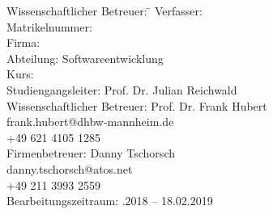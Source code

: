 \begin{titlepage}
\begin{center}
\begin{minipage}{\textwidth}

\begin{tabbing}
	Wissenschaftlicher Betreuer: \hspace{0.85cm}\=\kill
	Verfasser: \> \DerAutorDerArbeit \\[1.5mm]
	Matrikelnummer:  \\[1.5mm]
	Firma: \> \DerNameDerFirma  \\[1.5mm]
	Abteilung: \> Softwareentwicklung \\[1.5mm]
	Kurs: \> \DieKursbezeichnung \\[1.5mm]
	Studiengangsleiter: \> Prof. Dr. Julian Reichwald  \\[1.5mm]
	Wissenschaftlicher Betreuer: \> Prof. Dr. Frank Hubert  \\
	\> frank.hubert@dhbw-mannheim.de \\
	\> +49 621 4105 1285 \\[1.5mm]
	Firmenbetreuer: \> Danny Tschorsch \\
	\> danny.tschorsch@atos.net \\
	\> +49 211 3993 2559 \\[1.5mm]
	Bearbeitungszeitraum: .2018 -- 18.02.2019
\end{tabbing}
\end{minipage}

\end{center}

\end{titlepage}